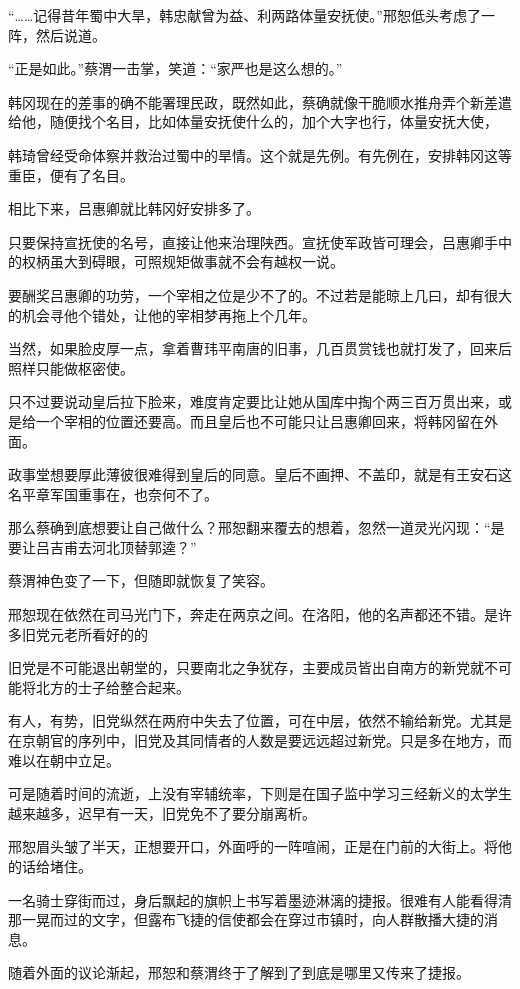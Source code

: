 “……记得昔年蜀中大旱，韩忠献曾为益、利两路体量安抚使。”邢恕低头考虑了一阵，然后说道。

“正是如此。”蔡渭一击掌，笑道：“家严也是这么想的。”

韩冈现在的差事的确不能署理民政，既然如此，蔡确就像干脆顺水推舟弄个新差遣给他，随便找个名目，比如体量安抚使什么的，加个大字也行，体量安抚大使，

韩琦曾经受命体察并救治过蜀中的旱情。这个就是先例。有先例在，安排韩冈这等重臣，便有了名目。

相比下来，吕惠卿就比韩冈好安排多了。

只要保持宣抚使的名号，直接让他来治理陕西。宣抚使军政皆可理会，吕惠卿手中的权柄虽大到碍眼，可照规矩做事就不会有越权一说。

要酬奖吕惠卿的功劳，一个宰相之位是少不了的。不过若是能晾上几曰，却有很大的机会寻他个错处，让他的宰相梦再拖上个几年。

当然，如果脸皮厚一点，拿着曹玮平南唐的旧事，几百贯赏钱也就打发了，回来后照样只能做枢密使。

只不过要说动皇后拉下脸来，难度肯定要比让她从国库中掏个两三百万贯出来，或是给一个宰相的位置还要高。而且皇后也不可能只让吕惠卿回来，将韩冈留在外面。

政事堂想要厚此薄彼很难得到皇后的同意。皇后不画押、不盖印，就是有王安石这名平章军国重事在，也奈何不了。

那么蔡确到底想要让自己做什么？邢恕翻来覆去的想着，忽然一道灵光闪现：“是要让吕吉甫去河北顶替郭逵？”

蔡渭神色变了一下，但随即就恢复了笑容。

邢恕现在依然在司马光门下，奔走在两京之间。在洛阳，他的名声都还不错。是许多旧党元老所看好的的

旧党是不可能退出朝堂的，只要南北之争犹存，主要成员皆出自南方的新党就不可能将北方的士子给整合起来。

有人，有势，旧党纵然在两府中失去了位置，可在中层，依然不输给新党。尤其是在京朝官的序列中，旧党及其同情者的人数是要远远超过新党。只是多在地方，而难以在朝中立足。

可是随着时间的流逝，上没有宰辅统率，下则是在国子监中学习三经新义的太学生越来越多，迟早有一天，旧党免不了要分崩离析。

邢恕眉头皱了半天，正想要开口，外面呼的一阵喧闹，正是在门前的大街上。将他的话给堵住。

一名骑士穿街而过，身后飘起的旗帜上书写着墨迹淋漓的捷报。很难有人能看得清那一晃而过的文字，但露布飞捷的信使都会在穿过市镇时，向人群散播大捷的消息。

随着外面的议论渐起，邢恕和蔡渭终于了解到了到底是哪里又传来了捷报。

